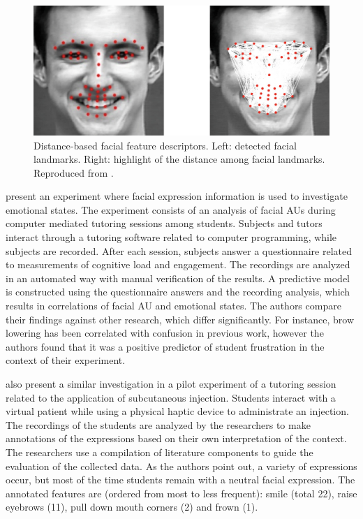 \begin{figure}[h]
    \centering
    \includegraphics[width=1.0\linewidth]{figures/samara2016sensing-distances.png}
    \caption{Distance-based facial feature descriptors. Left: detected facial landmarks. Right: highlight of the distance among facial landmarks. Reproduced from \textcite{samara2016sensing}.}
    \label{fig:distance-samara}
\end{figure}

\textcite{grafsgaard2013automatically} present an experiment where facial expression information is used to investigate emotional states. The experiment consists of an analysis of facial AUs during computer mediated tutoring sessions among students. Subjects and tutors interact through a tutoring software related to computer programming, while subjects are recorded. After each session, subjects answer a questionnaire related to measurements of cognitive load and engagement. The recordings are analyzed in an automated way with manual verification of the results. A predictive model is constructed using the questionnaire answers and the recording analysis, which results in correlations of facial AU and emotional states. The authors compare their findings against other research, which differ significantly. For instance, brow lowering has been correlated with confusion in previous work, however the authors found that it was a positive predictor of student frustration in the context of their experiment.

\textcite{heylen2005facial} also present a similar investigation in a pilot experiment of a tutoring session related to the application of subcutaneous injection. Students interact with a virtual patient while using a physical haptic device to administrate an injection. The recordings of the students are analyzed by the researchers to make annotations of the expressions based on their own interpretation of the context. The researchers use a compilation of literature components to guide the evaluation of the collected data. As the authors point out, a variety of expressions occur, but most of the time students remain with a neutral facial expression. The annotated features are (ordered from most to less frequent): smile (total 22), raise eyebrows (11), pull down mouth corners (2) and frown (1).

